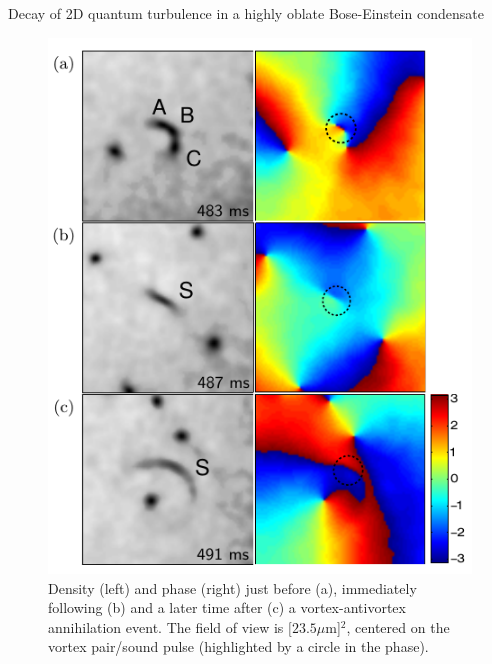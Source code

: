 \begin{chapter}{\label{cha:shin}Decay of 2D quantum turbulence in a highly oblate Bose-Einstein condensate}
\begin{figure}
\centering
\includegraphics[width=0.9\linewidth]{shin/fig5}
\caption{\label{fig:cresentPlots} Density (left) and phase (right) just before (a), immediately following (b) and a later time after (c) a vortex-antivortex annihilation event.  The field of view is  $[23.5\mu$m]$^2$, centered on the vortex pair/sound pulse (highlighted by a circle in the phase).}
\end{figure}


\end{chapter}
